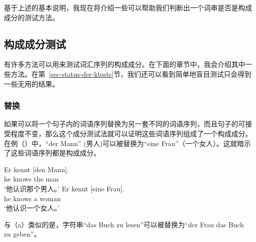 基于上述的基本说明，我现在将介绍一些可以帮助我们判断出一个词串是否是构成成分的测试方法。


\subsection{构成成分测试}
有许多方法可以用来测试词汇序列的构成成分。在下面的章节中，我会介绍其中一些方法。在第~\ref{sec-status-der-ktests}节，我们还可以看到简单地盲目测试只会得到一些无用的结果。

\subsubsection{替换}
如果可以将一个句子内的词语序列替换为另一套不同的词语序列，而且句子的可接受程度不变，那么这个成分测试法就可以证明这些词语序列组成了一个构成成分。
在例（）中，“der Mann” (男人)可以被替换为“eine Frau”（一个女人）。这就暗示了这些词语序列都是构成成分。

\eal
\ex 
\gll Er kennt [den Mann].\\
     he knows \spacebr{}the man\\
\glt `他认识那个男人。'
\ex 
\gll Er kennt [eine Frau].\\
     he knows \spacebr{}a woman\\
\glt `他认识一个女人。'
\zl

\noindent
与（a）类似的是，字符串“das Buch zu lesen”可以被替换为“der Frau das Buch zu geben”。

